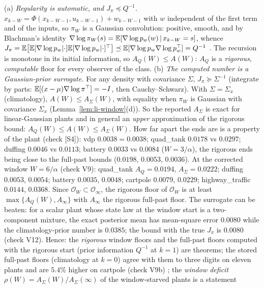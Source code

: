 \begin{remark}\label{rem:li-prior}
(a) \emph{Regularity is automatic, and $J_\pi\preceq Q^{-1}$.} $x_{k-W}=\Phi(x_{k-W-1},u_{k-W-1})+w_{k-W-1}$ with $w$
independent of the first term and of the inputs, so $\pi_W$ is a Gaussian convolution: positive, smooth, and by
Blachman's identity $\nabla\log\pi_W(s)=\mathbb E[\nabla\log p_w(w)\,|\,x_{k-W}=s]$, whence
$J_\pi=\mathbb E\big[\mathbb E[\nabla\log p_w|\cdot]\mathbb E[\nabla\log p_w|\cdot]^\top\big]\preceq\mathbb E[\nabla\log p_w\nabla\log p_w^\top]=Q^{-1}$
\citep{stam1959some,zamir1998proof}. The recursion is monotone in its initial information, so
$A_Q(W)\le A(W)$: $A_Q$ is a \emph{rigorous, computable} floor for every observer of the class.
(b) \emph{The computed number is a Gaussian-prior surrogate.} For any density with covariance $\Sigma$,
$J_\pi\succeq\Sigma^{-1}$ (integrate by parts: $\mathbb E[(x-\mu)\nabla\log\pi^\top]=-I$, then Cauchy--Schwarz). With
$\Sigma=\Sigma_x$ (climatology), $A(W)\le A_\Sigma(W)$, with equality when $\pi_W$ is Gaussian with covariance
$\Sigma_x$ (Lemma~\ref{lem:li-window}(d)). So the reported $A_\Sigma$ is exact for linear-Gaussian plants and in
general an \emph{upper} approximation of the rigorous bound: $A_Q(W)\le A(W)\le A_\Sigma(W)$. How far apart the ends
are is a property of the plant (check [S4]): vdp $0.0038=0.0038$; quad\_tank $0.0178$ vs $0.0297$; duffing $0.0046$ vs
$0.0113$; battery $0.0033$ vs $0.0084$ ($W=3/\alpha$), the rigorous ends being close to the full-past bounds
($0.0198$, $0.0053$, $0.0036$).  At the corrected window $W=6/\alpha$ (check V9):
quad\_tank $A_Q=0.0194$, $A_\Sigma=0.0222$; duffing $0.0053$, $0.0054$; battery $0.0035$, $0.0048$; cartpole $0.0079$,
$0.0229$; highway\_traffic $0.0144$, $0.0368$. Since $\mathcal O_W\subset\mathcal O_\infty$, the rigorous floor of
$\mathcal O_W$ is at least $\max\{A_Q(W),A_\infty\}$ with $A_\infty$ the rigorous full-past floor. The surrogate
can be beaten: for a scalar plant whose state law at the window start is a two-component mixture, the exact
posterior mean has mean-square error $0.0080$ while the climatology-prior number is $0.0385$; the bound with the true
$J_\pi$ is $0.0080$ (check V12). Hence: the \emph{rigorous} window floors and the full-past floors computed with the rigorous start (prior information
$Q^{-1}$ at $k=1$) are theorems; the stored full-past floors (climatology at $k=0$) agree with them to three digits on eleven
plants and are $5.4\%$ higher on cartpole (check V9b) ; the \emph{window deficit} $\rho(W)=A_\Sigma(W)/A_\Sigma(\infty)$ of the window-starved plants is a statement

\end{remark}
